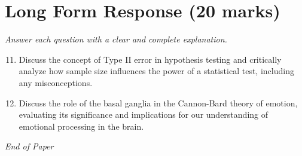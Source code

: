 \documentclass[12pt]{article}
\begin{document}
\section*{Long Form Response (20 marks)}
\textit{Answer each question with a clear and complete explanation.}
\begin{enumerate}[label=\arabic*.]
\setcounter{enumi}{10}
\item Discuss the concept of Type II error in hypothesis testing and critically analyze how sample size influences the power of a statistical test, including any misconceptions.
\item Discuss the role of the basal ganglia in the Cannon-Bard theory of emotion, evaluating its significance and implications for our understanding of emotional processing in the brain.
\end{enumerate}

\vfill
\noindent\textit{End of Paper}
\end{document}
